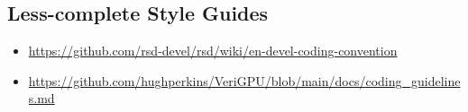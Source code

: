 \begin{appendices}
\section{Less-complete Style Guides}

\begin{itemize}
    \item \url{https://github.com/rsd-devel/rsd/wiki/en-devel-coding-convention}
    \item \url{https://github.com/hughperkins/VeriGPU/blob/main/docs/coding_guidelines.md}
\end{itemize}

\end{appendices}
